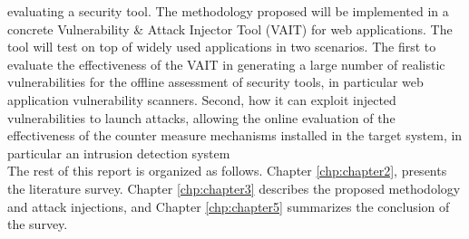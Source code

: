 evaluating a security tool.
The methodology proposed will be implemented in a concrete Vulnerability \& Attack Injector Tool (VAIT) for web
applications. The tool will test on top of widely used applications in two scenarios. The first to evaluate the
effectiveness of the VAIT in generating a large number of
realistic vulnerabilities for the offline assessment of security tools, in particular web application vulnerability
scanners. Second, how it can exploit injected
vulnerabilities to launch attacks, allowing the online evaluation of the effectiveness of the counter measure mechanisms installed in the target system, in particular an
intrusion detection system\\
\newline
The rest of this report is organized as follows. Chapter \ref{chp:chapter2}, presents the literature survey. Chapter \ref{chp:chapter3} describes the proposed methodology and attack injections,   and Chapter \ref{chp:chapter5} summarizes the conclusion of the survey.

